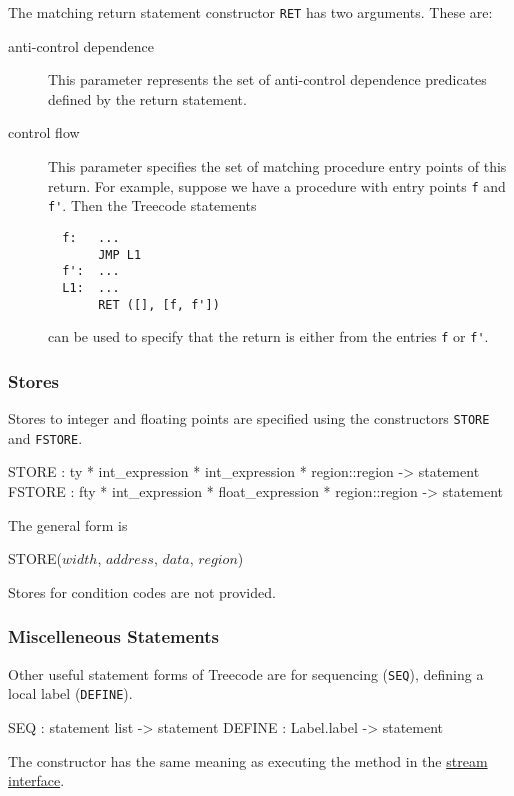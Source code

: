The matching return statement constructor \verb|RET| has two
arguments.  These are:
\begin{description}
  \item[anti-control dependence]  This parameter represents
the set of anti-control dependence predicates defined by the return
statement.
  \item[control flow]  This parameter specifies the set of matching
procedure entry points of this return.  For example, suppose we have
a procedure with entry points \verb|f| and \verb|f'|.  
Then the Treecode statements 
\begin{verbatim}
  f:   ...
       JMP L1
  f':  ...
  L1:  ...
       RET ([], [f, f'])
\end{verbatim}
\noindent can be used to specify that the return is either from
the entries \verb|f| or \verb|f'|.  
\end{description}

\subsubsection{Stores}
Stores to integer and floating points are specified using the
constructors \verb|STORE| and \verb|FSTORE|.   
\begin{SML}
   STORE  : ty * int_expression * int_expression * region::region -> statement
   FSTORE : fty * int_expression * float_expression * region::region -> statement
\end{SML}

The general form is
\begin{SML}
   STORE(\(width\), \(address\), \(data\), \(region\))
\end{SML}

Stores for condition codes are not provided.
\subsubsection{Miscelleneous Statements}

Other useful statement forms of Treecode are for sequencing (\verb|SEQ|),
defining a local label (\verb|DEFINE|).
\begin{SML}
   SEQ    : statement list -> statement
   DEFINE : Label.label -> statement
\end{SML}
The constructor  has the same meaning as 
executing the method  in the 
\href{stream.html}{stream interface}.

